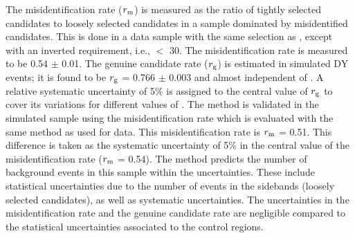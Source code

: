 The misidentification rate ($r_{\rm m}$) is measured as the ratio of tightly selected \Tau candidates to loosely 
selected \Tau candidates in a sample dominated by misidentified \Tau candidates. 
This is done in a data sample with the same selection as \leptonTau, except with an inverted
\MPT requirement, i.e., \MPT $<$ 30\GeV. The misidentification rate is measured to be 0.54 $\pm$ 0.01.
The genuine \Tau candidate rate ($r_{\rm g}$) is estimated in simulated DY events; it is found to 
be $r_{\rm g}$ = 0.766 $\pm$ 0.003 and almost independent of \mttwo. 
A relative systematic uncertainty of 5\% is assigned to the central value of $r_{\rm g}$ to cover its 
variations for different values of \mttwo.
The method is validated in the simulated \wjets sample using the misidentification rate which is evaluated with the same method as used for data. 
This misidentification rate is $r_{\rm m}$ = 0.51. 
This difference is taken as the systematic uncertainty of 5\% 
in the central value of the misidentification rate ($r_{\rm m}$ = 0.54).
The method predicts the number of \leptonTau background events in this sample within the 
uncertainties.
These include statistical uncertainties due to the number of events in the 
sidebands (loosely selected \Tau candidates), as well as 
systematic uncertainties.
The uncertainties in the 
misidentification rate and the genuine \Tau candidate rate 
are negligible compared to the statistical uncertainties associated to 
the control regions. 

